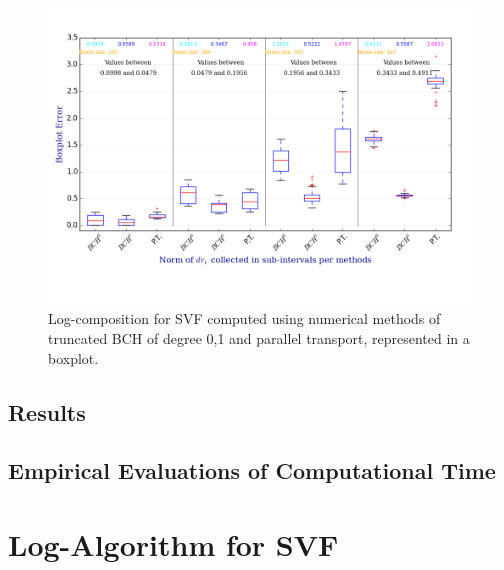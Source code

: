 \begin{figure}[!ht]
	\hspace{-2cm}
	\includegraphics[scale=0.69]{figures/SVF_boxplot.png}
	\caption{Log-composition for SVF computed using numerical methods of truncated BCH of degree 0,1 and parallel transport, represented in a boxplot.}
	\label{fig:SVF_boxplot}
\end{figure}


\subsection{Results}

\subsection{Empirical Evaluations of Computational Time}

\section{Log-Algorithm for SVF}

